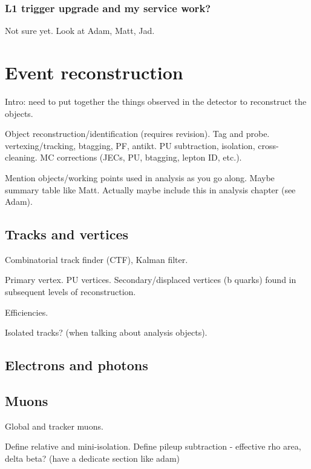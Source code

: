 \subsubsection{L1 trigger upgrade and my service work?}

Not sure yet. Look at Adam, Matt, Jad.

\section{Event reconstruction}
\label{sec:detector-reconstruction}

Intro: need to put together the things observed in the detector to reconstruct 
the objects.

Object reconstruction/identification (requires revision).
Tag and probe.
vertexing/tracking, btagging, PF, antikt.
PU subtraction, isolation, cross-cleaning.
MC corrections (JECs, PU, btagging, lepton ID, etc.).

Mention objects/working points used in analysis as you go along. Maybe summary 
table like Matt. Actually maybe include this in analysis chapter (see Adam).

\subsection{Tracks and vertices}

Combinatorial track finder (CTF), Kalman filter.

Primary vertex. PU vertices. Secondary/displaced vertices (b quarks) found in 
subsequent levels of reconstruction.

Efficiencies.

Isolated tracks? (when talking about analysis objects).

\subsection{Electrons and photons}

\subsection{Muons}

Global and tracker muons.

Define relative and mini-isolation.
Define pileup subtraction - effective rho area, delta beta?
(have a dedicate section like adam)

